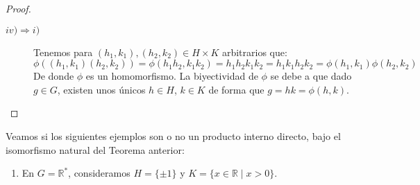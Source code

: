 \begin{teo}
\begin{proof}
\begin{description}
            \item [$iv)\Longrightarrow i)$] Tenemos para $(h_1,k_1),(h_2,k_2)\in H\times K$ arbitrarios que:
                \begin{equation*}
                    \phi((h_1,k_1)(h_2,k_2)) = \phi(h_1h_2,k_1k_2) = h_1h_2k_1k_2 = h_1k_1h_2k_2 = \phi(h_1,k_1)\phi(h_2,k_2)
                \end{equation*}
                De donde $\phi$ es un homomorfismo. La biyectividad de $\phi$ se debe a que dado $g\in G$, existen unos únicos $h\in H$, $k\in K$ de forma que $g = hk = \phi(h,k)$. \qedhere
        \end{description}
    \end{proof}
\end{teo}

\begin{ejemplo} %
    Veamos si los siguientes ejemplos son o no un producto interno directo, bajo el isomorfismo natural del Teorema anterior:
    \begin{enumerate}
        \item En $G = \mathbb{R}^\ast$, consideramos $H = \{\pm 1\}$ y $K = \{x\in \mathbb{R} \mid x > 0\}$.


\end{enumerate}
\end{ejemplo}
